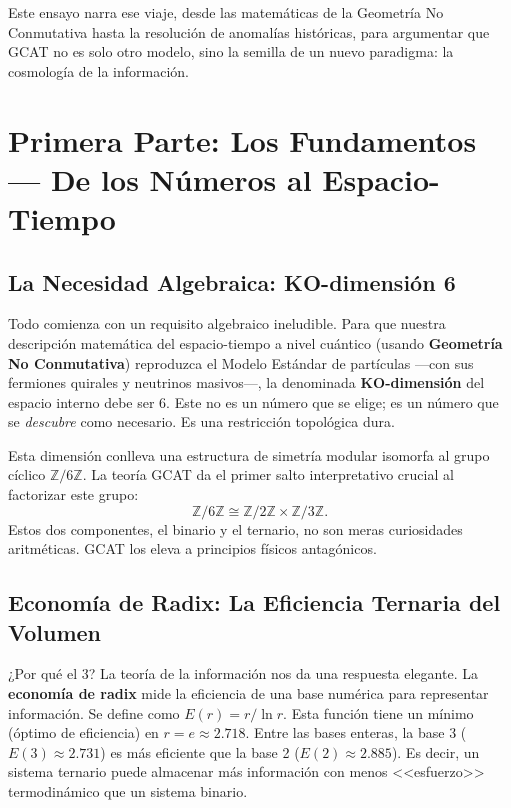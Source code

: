 \documentclass[12pt, a4paper]{article}
\begin{document}
Este ensayo narra ese viaje, desde las matemáticas de la Geometría No Conmutativa hasta la resolución de anomalías históricas, para argumentar que GCAT no es solo otro modelo, sino la semilla de un nuevo paradigma: la cosmología de la información.

\section{Primera Parte: Los Fundamentos — De los Números al Espacio-Tiempo}

\subsection{La Necesidad Algebraica: KO-dimensión 6}

Todo comienza con un requisito algebraico ineludible. Para que nuestra descripción matemática del espacio-tiempo a nivel cuántico (usando \textbf{Geometría No Conmutativa}) reproduzca el Modelo Estándar de partículas —con sus fermiones quirales y neutrinos masivos—, la denominada \textbf{KO-dimensión} del espacio interno debe ser 6. Este no es un número que se elige; es un número que se \textit{descubre} como necesario. Es una restricción topológica dura.

Esta dimensión conlleva una estructura de simetría modular isomorfa al grupo cíclico $\mathbb{Z}/6\mathbb{Z}$. La teoría GCAT da el primer salto interpretativo crucial al factorizar este grupo:
\begin{equation}
\mathbb{Z}/6\mathbb{Z} \cong \mathbb{Z}/2\mathbb{Z} \times \mathbb{Z}/3\mathbb{Z}.
\end{equation}
Estos dos componentes, el binario y el ternario, no son meras curiosidades aritméticas. GCAT los eleva a principios físicos antagónicos.

\subsection{Economía de Radix: La Eficiencia Ternaria del Volumen}

¿Por qué el 3? La teoría de la información nos da una respuesta elegante. La \textbf{economía de radix} mide la eficiencia de una base numérica para representar información. Se define como $E(r) = r / \ln r$. Esta función tiene un mínimo (óptimo de eficiencia) en $r = e \approx 2.718$. Entre las bases enteras, la base 3 ($E(3)\approx2.731$) es más eficiente que la base 2 ($E(2)\approx2.885$). Es decir, un sistema ternario puede almacenar más información con menos <<esfuerzo>> termodinámico que un sistema binario.
\end{document}
